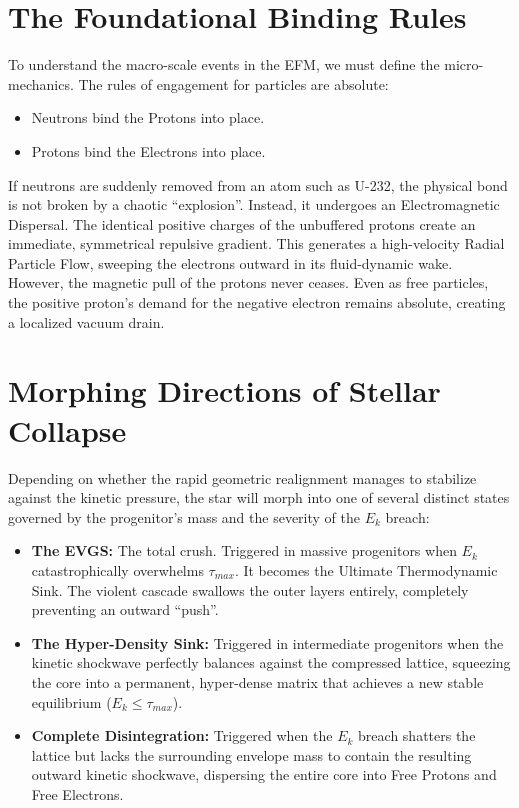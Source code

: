 \documentclass[11pt, a4paper]{article}
\begin{document}
\section{The Foundational Binding Rules}
  To understand the macro-scale events in the EFM, we must define the micro-mechanics. The rules of engagement for particles are absolute:
  \begin{itemize}
    \item Neutrons bind the Protons into place.
    \item Protons bind the Electrons into place.
  \end{itemize}
  If neutrons are suddenly removed from an atom such as U-232, the physical bond is not broken by a chaotic ``explosion''. Instead, it undergoes an Electromagnetic Dispersal. The identical positive charges of the unbuffered protons create an immediate, symmetrical repulsive gradient. This generates a high-velocity Radial Particle Flow, sweeping the electrons outward in its fluid-dynamic wake. However, the magnetic pull of the protons never ceases. Even as free particles, the positive proton's demand for the negative electron remains absolute, creating a localized vacuum drain.

\section{Morphing Directions of Stellar Collapse}
  Depending on whether the rapid geometric realignment manages to stabilize against the kinetic pressure, the star will morph into one of several distinct states governed by the progenitor's mass and the severity of the $E_k$ breach:
  \begin{itemize}
    \item \textbf{The EVGS:} The total crush. Triggered in massive progenitors when $E_k$ catastrophically overwhelms $\tau_{max}$. It becomes the Ultimate Thermodynamic Sink. The violent cascade swallows the outer layers entirely, completely preventing an outward ``push''.
    \item \textbf{The Hyper-Density Sink:} Triggered in intermediate progenitors when the kinetic shockwave perfectly balances against the compressed lattice, squeezing the core into a permanent, hyper-dense matrix that achieves a new stable equilibrium ($E_k \le \tau_{max}$). 
    \item \textbf{Complete Disintegration:} Triggered when the $E_k$ breach shatters the lattice but lacks the surrounding envelope mass to contain the resulting outward kinetic shockwave, dispersing the entire core into Free Protons and Free Electrons. 
  \end{itemize}
\end{document}
